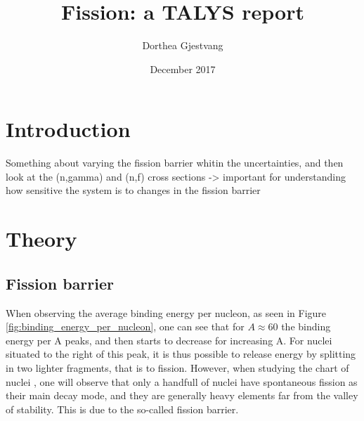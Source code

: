 \documentclass[]{article}
\title{}
\author{}
\begin{document}
	
\title{Fission: a TALYS report}
\author{Dorthea Gjestvang }
\date{December 2017}

\maketitle

\begin{abstract}

\end{abstract}

\section{Introduction}

Something about varying the fission barrier whitin the uncertainties, and then look at the (n,gamma) and (n,f) cross sections -> important for understanding how sensitive the system is to changes in the fission barrier

\section{Theory}
\label{Theory}
\subsection{Fission barrier}
When observing the average binding energy per nucleon, as seen in Figure \ref{fig:binding_energy_per_nucleon}, one can see that for $A \approx 60$ the binding energy per A peaks, and then starts to decrease for increasing A. For nuclei situated to the right of this peak, it is thus possible to release energy by splitting in two lighter fragments, that is to fission. However, when studying the chart of nuclei , one will observe that only a handfull of nuclei have spontaneous fission as their main decay mode, and they are generally heavy elements far from the valley of stability. This  is due to the so-called fission barrier. 
\par
\vspace{3mm}
\end{document}
